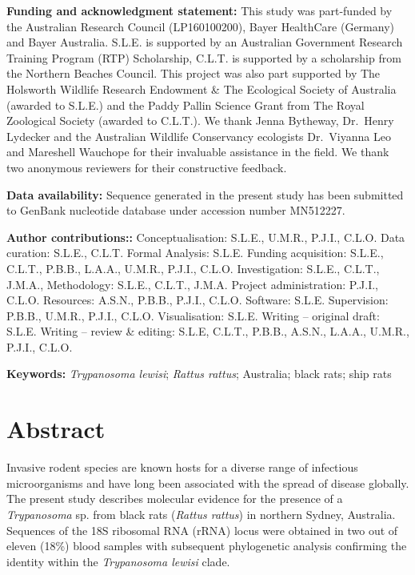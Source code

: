 \documentclass[a4paper, nobind]{templates/ociamthesis}
\begin{document}
\vspace{5mm}

\textbf{Funding and acknowledgment statement:} This study was part-funded by the Australian Research Council (LP160100200), Bayer HealthCare (Germany) and Bayer Australia. S.L.E. is supported by an Australian Government Research Training Program (RTP) Scholarship, C.L.T. is supported by a scholarship from the Northern Beaches Council. This project was also part supported by The Holsworth Wildlife Research Endowment \& The Ecological Society of Australia (awarded to S.L.E.) and the Paddy Pallin Science Grant from The Royal Zoological Society (awarded to C.L.T.). We thank Jenna Bytheway, Dr.~Henry Lydecker and the Australian Wildlife Conservancy ecologists Dr.~Viyanna Leo and Mareshell Wauchope for their invaluable assistance in the field. We thank two anonymous reviewers for their constructive feedback.

\vspace{5mm}

\textbf{Data availability:}
Sequence generated in the present study has been submitted to GenBank nucleotide database under accession number MN512227.

\vspace{5mm}

\textbf{Author contributions::}
Conceptualisation: S.L.E., U.M.R., P.J.I., C.L.O.
Data curation: S.L.E., C.L.T.
Formal Analysis: S.L.E.
Funding acquisition: S.L.E., C.L.T., P.B.B., L.A.A., U.M.R., P.J.I., C.L.O.
Investigation: S.L.E., C.L.T., J.M.A.,
Methodology: S.L.E., C.L.T., J.M.A.
Project administration: P.J.I., C.L.O.
Resources: A.S.N., P.B.B., P.J.I., C.L.O.
Software: S.L.E.
Supervision: P.B.B., U.M.R., P.J.I., C.L.O.
Visualisation: S.L.E.
Writing -- original draft: S.L.E.
Writing -- review \& editing: S.L.E, C.L.T., P.B.B., A.S.N., L.A.A., U.M.R., P.J.I., C.L.O.

\vspace{5mm}

\textbf{Keywords:} \emph{Trypanosoma lewisi}; \emph{Rattus rattus}; Australia; black rats; ship rats

\newpage

\hypertarget{abstract-3}{%
\section{Abstract}\label{abstract-3}}

Invasive rodent species are known hosts for a diverse range of infectious microorganisms and have long been associated with the spread of disease globally. The present study describes molecular evidence for the presence of a \emph{Trypanosoma} sp. from black rats (\emph{Rattus rattus}) in northern Sydney, Australia. Sequences of the 18S ribosomal RNA (rRNA) locus were obtained in two out of eleven (18\%) blood samples with subsequent phylogenetic analysis confirming the identity within the \emph{Trypanosoma lewisi} clade.
\end{document}
